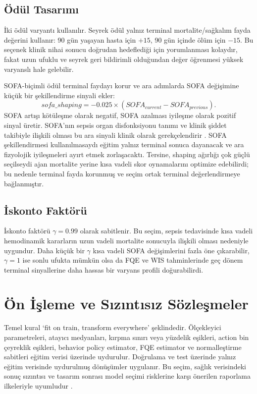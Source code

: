 \documentclass[conference]{IEEEtran}
\begin{document}
\subsection{Ödül Tasarımı}
İki ödül varyantı kullanılır. Seyrek ödül yalnız terminal mortalite/sağkalım fayda değerini kullanır: 90 gün yaşayan hasta için $+15$, 90 gün içinde ölüm için $-15$. Bu seçenek klinik nihai sonucu doğrudan hedeflediği için yorumlanması kolaydır, fakat uzun ufuklu ve seyrek geri bildirimli olduğundan değer öğrenmesi yüksek varyanslı hale gelebilir.

SOFA-biçimli ödül terminal faydayı korur ve ara adımlarda SOFA değişimine küçük bir şekillendirme sinyali ekler:
\begin{equation}
sofa\_shaping = -0.025 \times (SOFA_{current}-SOFA_{previous}).
\end{equation}
SOFA artışı kötüleşme olarak negatif, SOFA azalması iyileşme olarak pozitif sinyal üretir. SOFA'nın sepsis organ disfonksiyonu tanımı ve klinik şiddet takibiyle ilişkili olması bu ara sinyali klinik olarak gerekçelendirir \cite{singer2016sepsis3}. SOFA şekillendirmesi kullanılmasaydı eğitim yalnız terminal sonuca dayanacak ve ara fizyolojik iyileşmeleri ayırt etmek zorlaşacaktı. Tersine, shaping ağırlığı çok güçlü seçilseydi ajan mortalite yerine kısa vadeli skor oynamalarını optimize edebilirdi; bu nedenle terminal fayda korunmuş ve seçim ortak terminal değerlendirmeye bağlanmıştır.

\subsection{İskonto Faktörü}
İskonto faktörü $\gamma=0.99$ olarak sabitlenir. Bu seçim, sepsis tedavisinde kısa vadeli hemodinamik kararların uzun vadeli mortalite sonucuyla ilişkili olması nedeniyle uygundur. Daha küçük bir $\gamma$ kısa vadeli SOFA değişimlerini fazla öne çıkarabilir, $\gamma=1$ ise sonlu ufukta mümkün olsa da FQE ve WIS tahminlerinde geç dönem terminal sinyallerine daha hassas bir varyans profili doğurabilirdi.

\section{Ön İşleme ve Sızıntısız Sözleşmeler}
Temel kural `fit on train, transform everywhere' şeklindedir. Ölçekleyici parametreleri, atayıcı medyanları, kırpma sınırı veya yüzdelik eşikleri, action bin çeyreklik eşikleri, behavior policy estimator, FQE estimator ve normalleştirme sabitleri eğitim verisi üzerinde uydurulur. Doğrulama ve test üzerinde yalnız eğitim verisinde uydurulmuş dönüşümler uygulanır. Bu seçim, sağlık verisindeki sonuç sızıntısı ve tasarım sonrası model seçimi risklerine karşı önerilen raporlama ilkeleriyle uyumludur \cite{gottesman2019guidelines,liu2020healthcare}.
\end{document}
